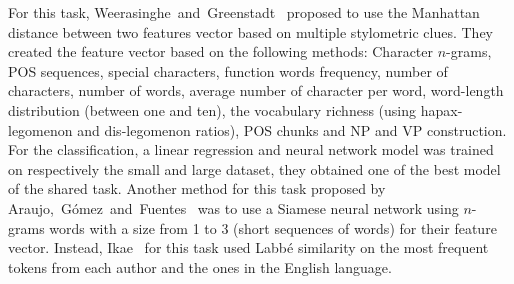 For this task, Weerasinghe~and~Greenstadt~\cite{feature_vector_pan20} proposed to use the Manhattan distance between two features vector based on multiple stylometric clues.
They created the feature vector based on the following methods: Character $n$-grams, POS sequences, special characters, function words frequency, number of characters, number of words, average number of character per word, word-length distribution (between one and ten), the vocabulary richness (using hapax-legomenon and dis-legomenon ratios), POS chunks and NP and VP construction.
For the classification, a linear regression and neural network model was trained on respectively the small and large dataset, they obtained one of the best model of the shared task.
Another method for this task proposed by Araujo,~Gómez~and~Fuentes~\cite{siamese_network_pan20} was to use a Siamese neural network using $n$-grams words with a size from 1 to 3 (short sequences of words) for their feature vector.
Instead, Ikae~\cite{unine_pan20_verif} for this task used Labbé similarity on the most frequent tokens from each author and the ones in the English language.
